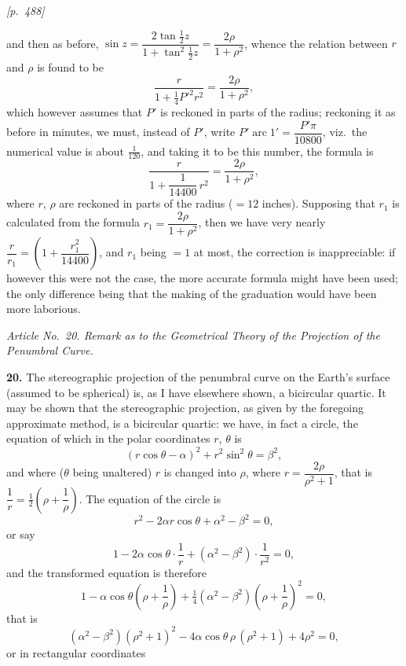 \documentclass[11pt]{article}
\begin{document}
\medskip

\noindent\textit{[p.~488]}

\medskip

and then as before, $\sin z = \dfrac{2\tan\tfrac{1}{2}z}{1+\tan^{2}\tfrac{1}{2}z} = \dfrac{2\rho}{1+\rho^{2}}$,
whence the relation between $r$ and $\rho$ is found to be
\[
\frac{r}{1+\tfrac{1}{4}P'^{2}r^{2}} = \frac{2\rho}{1+\rho^{2}},
\]
which however assumes that $P'$ is reckoned in parts of the radius;
reckoning it as before in minutes, we must, instead of $P'$, write
$P'\operatorname{arc}1' = \dfrac{P'\pi}{10800}$, viz.\ the numerical value
is about $\tfrac{1}{120}$, and taking it to be this number, the formula
is
\[
\frac{r}{1 + \dfrac{1}{14400}\,r^{2}} = \frac{2\rho}{1+\rho^{2}},
\]
where $r$, $\rho$ are reckoned in parts of the radius ($=12$ inches).
Supposing that $r_{1}$ is calculated from the formula
$r_{1} = \dfrac{2\rho}{1+\rho^{2}}$, then we have very nearly
$\dfrac{r}{r_{1}} = \!\left(1 + \dfrac{r_{1}^{2}}{14400}\right)$, and
$r_{1}$ being $=1$ at most, the correction is inappreciable: if however
this were not the case, the more accurate formula might have been used;
the only difference being that the making of the graduation would have
been more laborious.

\medskip

\begin{center}
\textit{Article No.\ 20. Remark as to the Geometrical Theory of the
Projection of the Penumbral Curve.}
\end{center}

\medskip

\textbf{20.} The stereographic projection of the penumbral curve on the
Earth's surface (assumed to be spherical) is, as I have elsewhere shown,
a bicircular quartic. It may be shown that the stereographic projection,
as given by the foregoing approximate method, is a bicircular quartic:
we have, in fact a circle, the equation of which in the polar coordinates
$r$, $\theta$ is
\[
(r\cos\theta - \alpha)^{2} + r^{2}\sin^{2}\theta = \beta^{2},
\]
and where ($\theta$ being unaltered) $r$ is changed into $\rho$, where
$r = \dfrac{2\rho}{\rho^{2}+1}$, that is
$\dfrac{1}{r} = \tfrac{1}{2}\!\left(\rho + \dfrac{1}{\rho}\right)$.
The equation of the circle is
\[
r^{2} - 2\alpha r\cos\theta + \alpha^{2} - \beta^{2} = 0,
\]
or say
\[
1 - 2\alpha\cos\theta\cdot\frac{1}{r} + (\alpha^{2}-\beta^{2})\cdot\frac{1}{r^{2}} = 0,
\]
and the transformed equation is therefore
\[
1 - \alpha\cos\theta\!\left(\rho + \frac{1}{\rho}\right) + \tfrac{1}{4}(\alpha^{2}-\beta^{2})\!\left(\rho + \frac{1}{\rho}\right)^{2} = 0,
\]
that is
\[
(\alpha^{2}-\beta^{2})(\rho^{2}+1)^{2} - 4\alpha\cos\theta\,\rho\,(\rho^{2}+1) + 4\rho^{2} = 0,
\]
or in rectangular coordinates
\end{document}
